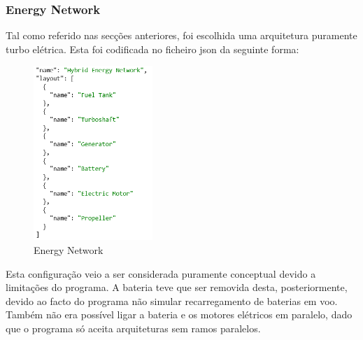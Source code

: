 \subsubsection{Energy Network}
Tal como referido nas secções anteriores, foi escolhida uma arquitetura puramente turbo elétrica. Esta foi codificada no ficheiro json da seguinte forma:
\FloatBarrier
\begin{figure}[h]
    \centering
    \includegraphics[width=0.4\textwidth]{Imagens/energy semana 3.png}
    \caption{Energy Network}
    \label{fig:my_label}
\end{figure}
\FloatBarrier
Esta configuração veio a ser considerada puramente conceptual devido a limitações do programa. A bateria teve que ser removida desta, posteriormente, devido ao facto do programa não simular recarregamento de baterias em voo. Também não era possível ligar a bateria e os motores elétricos em paralelo, dado que o programa só aceita arquiteturas sem ramos paralelos.\par